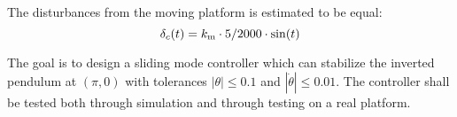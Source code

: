 The disturbances from the moving platform is estimated to be equal:
\begin{equation}
        \delta_c(t) = k_{\mathrm{m}} \cdot 5/2000 \cdot \sin(t)
\end{equation}

The goal is to design a sliding mode controller which can stabilize the inverted pendulum at $(\pi,0)$ with tolerances $|\theta| \leq 0.1$ and $|\dot{\theta}| \leq 0.01$. The controller shall be tested both through simulation and through testing on a real platform.